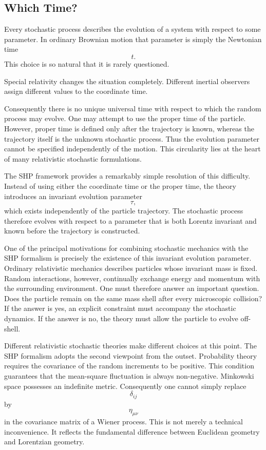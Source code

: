 \subsection{Which Time?}
Every stochastic process describes the evolution of a system with
respect to some parameter.
In ordinary Brownian motion that parameter is simply the Newtonian time
\[t.\]
This choice is so natural that it is rarely questioned.

Special relativity changes the situation completely.
Different inertial observers assign different values to the coordinate
time.

Consequently there is no unique universal time with respect to which the
random process may evolve.
One may attempt to use the proper time of the particle.
However, proper time is defined only after the trajectory is known,
whereas the trajectory itself is the unknown stochastic process.
Thus the evolution parameter cannot be specified independently of the
motion.
This circularity lies at the heart of many relativistic stochastic
formulations.

The SHP framework provides a remarkably simple resolution of this
difficulty.
Instead of using either the coordinate time or the proper time, the
theory introduces an invariant evolution parameter
\[\tau ,\]
which exists independently of the particle trajectory.
The stochastic process therefore evolves with respect to a parameter
that is both Lorentz invariant and known before the trajectory is
constructed.

One of the principal motivations for combining stochastic mechanics with
the SHP formalism is precisely the existence of this invariant
evolution parameter.
Ordinary relativistic mechanics describes particles whose invariant mass
is fixed.
Random interactions, however, continually exchange energy and momentum
with the surrounding environment.
One must therefore answer an important question.
Does the particle remain on the same mass shell after every microscopic
collision?
If the answer is yes, an explicit constraint must accompany the
stochastic dynamics.
If the answer is no, the theory must allow the particle to evolve
off-shell.

Different relativistic stochastic theories make different choices at
this point.
The SHP formalism adopts the second viewpoint from the outset.
Probability theory requires the covariance of the random increments to
be positive.
This condition guarantees that the mean-square fluctuation is always
non-negative.
Minkowski space possesses an indefinite metric.
Consequently one cannot simply replace
\[\delta_{ij}\]
by
\[\eta_{\mu\nu}\]
in the covariance matrix of a Wiener process.
This is not merely a technical inconvenience.
It reflects the fundamental difference between Euclidean geometry and
Lorentzian geometry.

